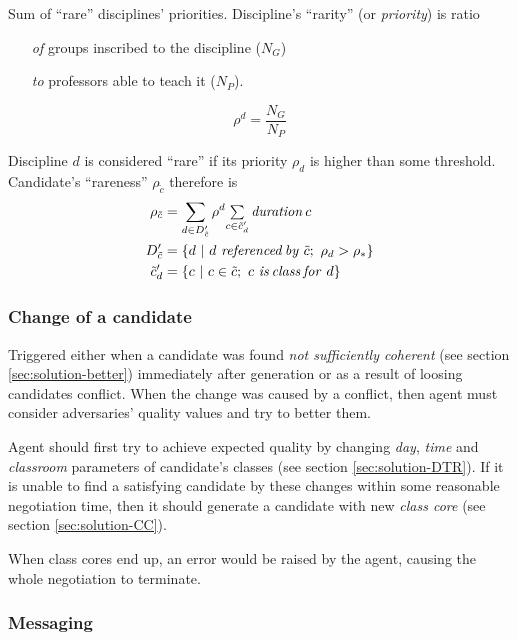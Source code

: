 \documentclass[../../ThesisDoc]{subfiles}
\begin{document}
\bigskip
\noindent
{}


Sum of ``rare'' disciplines' priorities. Discipline's ``rarity'' (or
\emph{priority}) is ratio
\begin{itemize}
  \item[\textit{of}] groups  inscribed to the discipline ($N_G$)
  \item[\textit{to}] professors able to teach it ($N_P$).
\end{itemize}

$$\rho^d = \dfrac{N_G}{N_P}$$

\medskip
\noindent
Discipline $d$ is considered ``rare'' if its priority $\rho_d$ is higher than
some threshold. \\
\noindent
Candidate's ``rareness'' $\rho_{\tilde{c}}$ therefore is
\begin{align*}
  \rho_{\tilde{c}} &= \sum\limits_{d \in D'_{\tilde{c}}}
        \rho^d \mathsmaller{ \sum\limits_{c \in \tilde{c}'_d}
                              \mathit{duration}\, c }\\
  D'_{\tilde{c}} &= \lbrace d ~|~ d ~\mathit{referenced\,by}~ \tilde{c};~
                                \rho_d > \rho_* \rbrace\\
  \tilde{c}'_d &= \lbrace c ~|~ c \in \tilde{c};~ c ~\mathit{is\,class\,for}~ d \rbrace
\end{align*}


\subsubsection{Change of a candidate}
\label{sec:solution-change}

Triggered either when a candidate was found \emph{not sufficiently coherent}
(see section \ref{sec:solution-better}) immediately after generation
or as a result of loosing candidates conflict.
When the change was caused by a conflict, then agent must consider adversaries'
quality values and try to better them.

Agent should first try to achieve expected quality by changing
\emph{day}, \emph{time} and \emph{classroom} parameters of candidate's classes
(see section \ref{sec:solution-DTR}).
If it is unable to find a satisfying candidate by these changes within some
reasonable negotiation time, then it should generate a candidate with new
\emph{class core} (see section \ref{sec:solution-CC}).

When class cores end up, an error would be raised by the agent, causing the whole
negotiation to terminate.


\subsubsection{Messaging}
\todo
\end{document}
